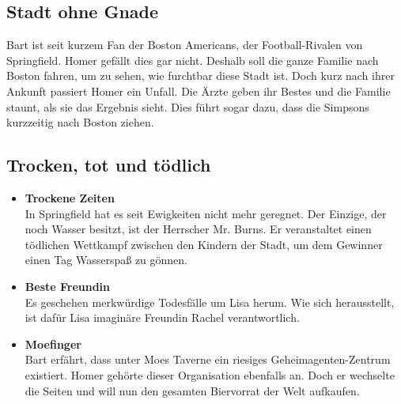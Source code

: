 
\subsection{Stadt ohne Gnade}\label{VABF17}
Bart ist seit kurzem Fan der Boston Americans, der Football-Rivalen von Springfield. Homer gefällt dies gar nicht. Deshalb soll die ganze Familie nach Boston fahren, um zu sehen, wie furchtbar diese Stadt ist. Doch kurz nach ihrer Ankunft passiert Homer ein Unfall. Die Ärzte geben ihr Bestes und die Familie staunt, als sie das Ergebnis sieht. Dies führt sogar dazu, dass die Simpsons kurzzeitig nach Boston ziehen.


\subsection{Trocken, tot und tödlich}
\begin{itemize}
  \item \textbf{Trockene Zeiten}\\ In Springfield hat es seit Ewigkeiten nicht mehr geregnet. Der Einzige, der noch Wasser besitzt, ist der Herrscher Mr. Burns. Er veranstaltet einen tödlichen Wettkampf zwischen den Kindern der Stadt, um dem Gewinner einen Tag Wasserspaß zu gönnen.
  \item \textbf{Beste Freundin}\\ Es geschehen merkwürdige Todesfälle um Lisa herum. Wie sich herausstellt, ist dafür Lisa imaginäre Freundin Rachel verantwortlich.
  \item \textbf{Moefinger}\\ Bart erfährt, dass unter Moes Taverne ein riesiges Geheimagenten-Zentrum existiert. Homer gehörte dieser Organisation ebenfalls an. Doch er wechselte die Seiten und will nun den gesamten Biervorrat der Welt aufkaufen.
\end{itemize}

